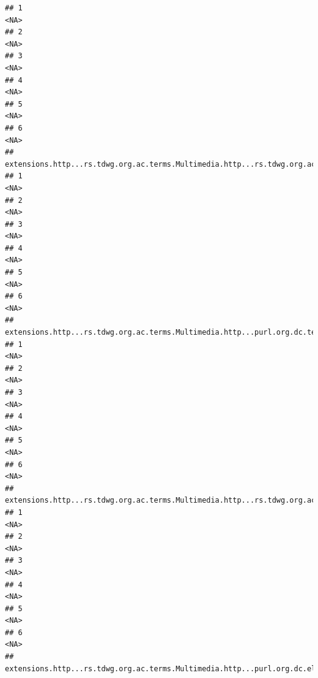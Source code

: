 \documentclass[
]{book}
\begin{document}
\begin{verbatim}
## 1                                                                                       <NA>
## 2                                                                                       <NA>
## 3                                                                                       <NA>
## 4                                                                                       <NA>
## 5                                                                                       <NA>
## 6                                                                                       <NA>
##   extensions.http...rs.tdwg.org.ac.terms.Multimedia.http...rs.tdwg.org.ac.terms.caption.1
## 1                                                                                    <NA>
## 2                                                                                    <NA>
## 3                                                                                    <NA>
## 4                                                                                    <NA>
## 5                                                                                    <NA>
## 6                                                                                    <NA>
##   extensions.http...rs.tdwg.org.ac.terms.Multimedia.http...purl.org.dc.terms.title.1
## 1                                                                               <NA>
## 2                                                                               <NA>
## 3                                                                               <NA>
## 4                                                                               <NA>
## 5                                                                               <NA>
## 6                                                                               <NA>
##   extensions.http...rs.tdwg.org.ac.terms.Multimedia.http...rs.tdwg.org.ac.terms.accessURI.1
## 1                                                                                      <NA>
## 2                                                                                      <NA>
## 3                                                                                      <NA>
## 4                                                                                      <NA>
## 5                                                                                      <NA>
## 6                                                                                      <NA>
##   extensions.http...rs.tdwg.org.ac.terms.Multimedia.http...purl.org.dc.elements.1.1.source.1

\end{verbatim}
\end{document}
